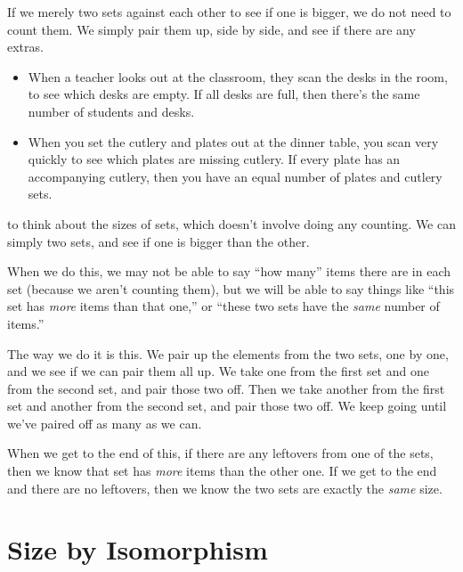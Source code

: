 \documentclass[../../../main.tex]{subfiles}
\begin{document}
\begin{aside}
  \begin{remark}
    If we merely  two sets against each other to see if one is bigger, we do not need to count them. We simply pair them up, side by side, and see if there are any extras.

    \begin{itemize}

      \item When a teacher looks out at the classroom, they scan the desks in the room, to see which desks are empty. If all desks are full, then there's the same number of students and desks.

      \item When you set the cutlery and plates out at the dinner table, you scan very quickly to see which plates are missing cutlery. If every plate has an accompanying cutlery, then you have an equal number of plates and cutlery sets.

    \end{itemize}
  \end{remark}
\end{aside}

 to think about the sizes of sets, which doesn't involve doing any counting. We can simply  two sets, and see if one is bigger than the other. 

When we do this, we may not be able to say ``how many'' items there are in each set (because we aren't counting them), but we will be able to say things like ``this set has \emph{more} items than that one,'' or ``these two sets have the \emph{same} number of items.''

The way we do it is this. We pair up the elements from the two sets, one by one, and we see if we can pair them all up. We take one from the first set and one from the second set, and pair those two off. Then we take another from the first set and another from the second set, and pair those two off. We keep going until we've paired off as many as we can. 

When we get to the end of this, if there are any leftovers from one of the sets, then we know that set has \emph{more} items than the other one. If we get to the end and there are no leftovers, then we know the two sets are exactly the \emph{same} size.


\section{Size by Isomorphism}
\end{document}
